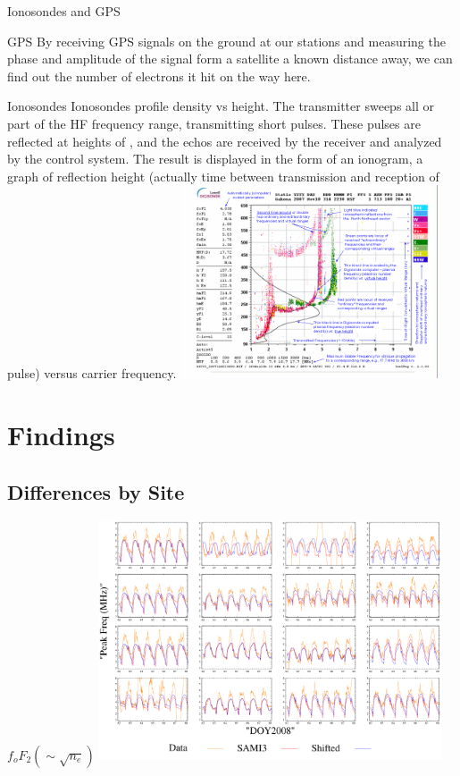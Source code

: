 \documentclass{beamer}
\begin{document}
\begin{frame}{Ionosondes and GPS}
  \begin{block}{GPS}\tiny
    By receiving GPS signals on the ground at our stations and measuring the phase and amplitude of the signal form a satellite a known distance away, we can find out the number of electrons it hit on the way here. 
  \end{block}
  \begin{block}{Ionosondes}
    \tiny Ionosondes profile density vs height.
    The transmitter sweeps all or part of the HF frequency range, transmitting short pulses. These pulses are reflected at heights of ,
    and the echos are received by the receiver and analyzed by the control system. The result is displayed in the form of an ionogram, a graph of reflection height (actually time between transmission and reception of pulse) versus carrier frequency.
    \includegraphics[width=3in]{Dsonde}
  \end{block}
\end{frame}


\section{Findings} 
\subsection{Differences by Site}
\begin{frame}{$f_oF_2 (\sim\sqrt{n_e})$}
  \includegraphics[width=4in]{fs}
\end{frame}
\end{document}
